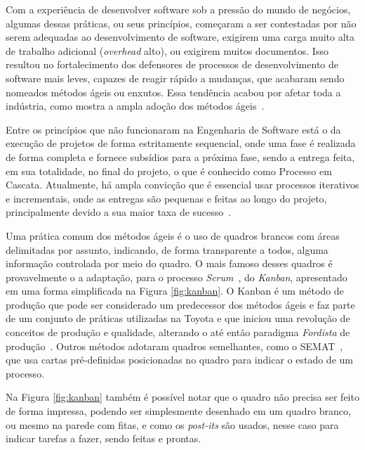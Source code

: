\documentclass[fontsize=12pt, a4paper,pagesize=auto,toc=listof, ,twoside,chapterprefix=false,appendixprefix=true,open=right]{scrbook}
\begin{document}
Com a experiência de desenvolver software sob a pressão do mundo de negócios, algumas dessas práticas, ou seus princípios,  começaram a ser contestadas por não serem adequadas ao desenvolvimento de software, exigirem uma carga muito alta de trabalho adicional (\textit{overhead} alto), ou exigirem muitos documentos. Isso resultou no fortalecimento dos defensores de processos de desenvolvimento de software mais leves, capazes de reagir rápido a mudanças, que acabaram sendo nomeados métodos ágeis ou enxutos. Essa tendência acabou por afetar toda a indústria, como mostra a ampla adoção dos métodos ágeis~\citep{agilestate15}.

Entre os princípios que não funcionaram na Engenharia de Software está o da execução de projetos de forma estritamente sequencial, onde uma fase é realizada de forma completa e fornece subsídios para a próxima fase, sendo a entrega feita, em sua totalidade, no final do projeto, o que é conhecido como Processo em Cascata. Atualmente, há ampla convicção que é essencial usar processos iterativos e incrementais, onde as entregas são pequenas e feitas ao longo do projeto, principalmente devido a sua maior taxa de sucesso~\citep{pressman:2019,chaos:2015}.

Uma prática comum dos métodos ágeis é o uso de quadros brancos com áreas delimitadas por assunto, indicando, de forma transparente a todos, alguma informação controlada  por meio do quadro. O mais famoso desses quadros é provavelmente o a adaptação, para o processo \textit{Scrum}~\citep{scrum:sbok:guide}, do \textit{Kanban}, apresentado em uma forma simplificada na Figura \ref{fig:kanban}. O Kanban é um método de produção que pode ser considerado um predecessor dos métodos ágeis e faz  parte de um conjunto de práticas utilizadas na Toyota e que iniciou uma revolução de conceitos de produção e qualidade, alterando o até então paradigma \textit{Fordista} de produção~\citep{gross:2003:kanban}. Outros métodos adotaram quadros semelhantes, como o SEMAT~\citep{jacobson_essentials_2019}, que usa cartas pré-definidas posicionadas no quadro para indicar o estado de um processo.

Na Figura \ref{fig:kanban} também é possível notar que o quadro não precisa ser feito de forma impressa, podendo ser simplesmente desenhado em um quadro branco, ou mesmo na parede com fitas, e como os \textit{post-its} são usados, nesse caso para indicar tarefas a fazer, sendo feitas e prontas.
\end{document}

